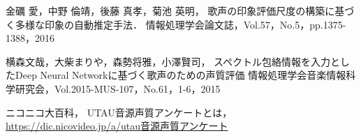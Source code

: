 \documentclass{jarticle}
\begin{document}
\begin{thebibliography}{9}

金礪 愛，中野 倫靖，後藤 真孝，菊池 英明，
歌声の印象評価尺度の構築に基づく多様な印象の自動推定手法．
情報処理学会論文誌，Vol.57，No.5，pp.1375-1388，2016

横森文哉，大柴まりや，森勢将雅，小澤賢司，
スペクトル包絡情報を入力としたDeep Neural Networkに基づく歌声のための声質評価
情報処理学会音楽情報科学研究会，Vol.2015-MUS-107，No.61，1-6，2015

ニコニコ大百科，
UTAU音源声質アンケートとは，
\url{https://dic.nicovideo.jp/a/utau音源声質アンケート}

\end{thebibliography}
\end{document}
